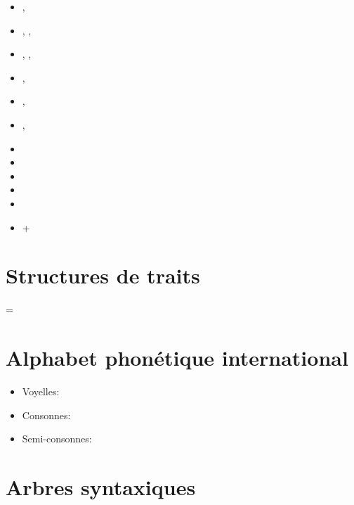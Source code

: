 \documentclass{article}
\begin{document}
\begin{multicols}{3}
\begin{itemize}
	\item \Prepar, \Prox
	\item \Incep, \Fin, \Cont
	\item \Obstr, \Stop, \Excess
	\item \Caus, 
	\item \Liqu, 
	\item \Perm, 
	\item \Son
	\item \Manif
	\item \Involv
	\item {}
	\item {}
	\item \Q\Anti\Magn+\Anti\Ver
\end{itemize}
\end{multicols}




\section{Structures de traits}


 = 



\section{Alphabet phonétique international}

\begin{itemize}
	\item Voyelles: 
	\item Consonnes: 
	\item Semi-consonnes: \textipa{[j4w]}
\end{itemize}

\section{Arbres syntaxiques}
\end{document}
